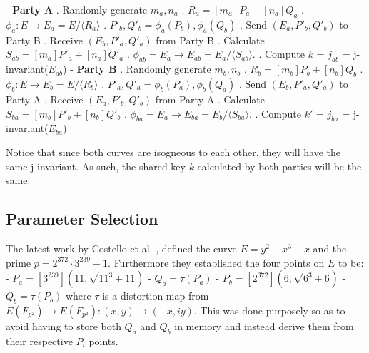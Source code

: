 \documentclass[10pt,twocolumn]{article} %
\begin{document}
- \textbf{Party A} 
. Randomly generate $ m_{a},n_{a}$
. $R_{a} = [m_{a}]P_{a}+[n_{a}]Q_{a}$
. $\phi_{a}: E \rightarrow E_{a} = E/\langle R_{a}\rangle$
. $P'_{b},Q'_{b}=\phi_{a}(P_{b}),\phi_{a}(Q_{b})$
. Send $(E_{a}, P'_{b}, Q'_{b})$ to Party B
. Receive $(E_b, P'_a, Q'_a)$ from Party B
. Calculate $S_{ab} = [m_a]P'_a+[n_a]Q'_a$ 
. $\phi_{ab}=E_{a}\rightarrow E_{ab} = E_{a}/ \langle S_{ab} \rangle $.
. Compute $k$ = $j_{ab}$ = j-invariant($E_{ab}$)
\newline
\newline
- \textbf{Party B}
. Randomly generate $ m_{b},n_{b}$
. $R_{b} = [m_{b}]P_{b}+[n_{b}]Q_{b}$
. $\phi_{b}: E \rightarrow E_{b} = E/\langle R_b\rangle$
. $P'_{a},Q'_{a}=\phi_{b}(P_{a}),\phi_{b}(Q_{a})$
. Send $(E_{b}, P'_{a}, Q'_{a})$ to Party A
. Receive $(E_a, P'_b, Q'_b)$ from Party A
. Calculate $S_{ba} = [m_b]P'_b+[n_b]Q'_b$ 
. $\phi_{ba}=E_{a}\rightarrow E_{ba} = E_{b}/ \langle S_{ba} \rangle $.
. Compute $k'$ = $j_{ba}$ = j-invariant($E_{ba}$)
\newline



\par Notice that since both curves are isogneous to each other, they will have the same j-invariant. As such, the shared key $k$ calculated by both parties will be the same.




\subsection{Parameter Selection}
\label{sec:params}
The latest work by Costello et al. \cite{costello2016}, defined the curve $E = y^2+x^3 +x$ and the prime $p = 2^{372}\cdot 3^{239}-1$. Furthermore they established the four points on $E$ to be: \\
- $P_{a} = [3^{239}](11,\sqrt{11^3+11})$ \newline
- $Q_a=\tau(P_a)$ \newline
- $P_b=[2^{372}](6,\sqrt{6^3+6})$ \newline
- $Q_b=\tau(P_b)$ \newline
where $\tau$ is a distortion map from $E(F_{p^2})\rightarrow E(F_{p^2}) : (x,y) \rightarrow (-x,iy)$. This was done purposely so as to avoid having to store both $Q_a$ and $Q_b$ in memory and instead derive them from their respective $P_i$ points.
\end{document}
